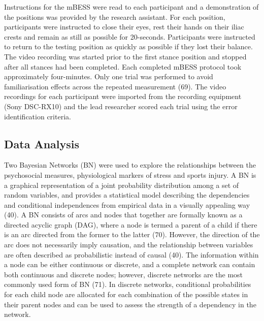 \documentclass[
  english,
  man]{apa6}
\begin{document}
Instructions for the mBESS were read to each participant and a demonstration of the positions was provided by the research assistant.
For each position, participants were instructed to close their eyes, rest their hands on their iliac crests and remain as still as possible for 20-seconds.
Participants were instructed to return to the testing position as quickly as possible if they lost their balance.
The video recording was started prior to the first stance position and stopped after all stances had been completed.
Each completed mBESS protocol took approximately four-minutes.
Only one trial was performed to avoid familiarisation effects across the repeated measurement (69).
The video recordings for each participant were imported from the recording equipment (Sony DSC-RX10) and the lead researcher scored each trial using the error identification criteria.

\hypertarget{data-analysis}{%
\subsection{Data Analysis}\label{data-analysis}}

Two Bayesian Networks (BN) were used to explore the relationships between the psychosocial measures, physiological markers of stress and sports injury.
A BN is a graphical representation of a joint probability distribution among a set of random variables, and provides a statistical model describing the dependencies and conditional independences from empirical data in a visually appealing way (40).
A BN consists of arcs and nodes that together are formally known as a directed acyclic graph (DAG), where a node is termed a parent of a child if there is an arc directed from the former to the latter (70).
However, the direction of the arc does not necessarily imply causation, and the relationship between variables are often described as probabilistic instead of causal (40).
The information within a node can be either continuous or discrete, and a complete network can contain both continuous and discrete nodes; however, discrete networks are the most commonly used form of BN (71).
In discrete networks, conditional probabilities for each child node are allocated for each combination of the possible states in their parent nodes and can be used to assess the strength of a dependency in the network.
\end{document}
